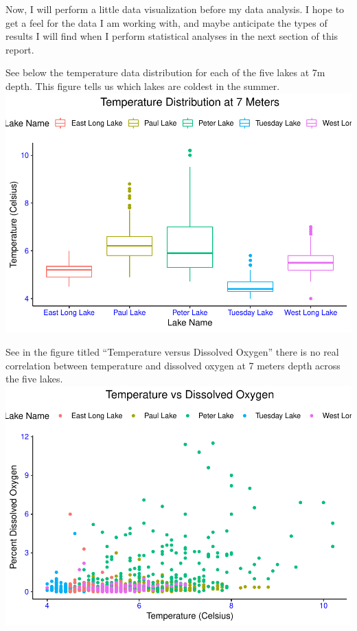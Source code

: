 \documentclass[12pt,]{article}
\begin{document}
Now, I will perform a little data visualization before my data analysis.
I hope to get a feel for the data I am working with, and maybe
anticipate the types of results I will find when I perform statistical
analyses in the next section of this report.

See below the temperature data distribution for each of the five lakes
at 7m depth. This figure tells us which lakes are coldest in the summer.
\includegraphics{KeithBollt_ENV872_FinalProject_files/figure-latex/visualization-1.pdf}

See in the figure titled ``Temperature versus Dissolved Oxygen'' there
is no real correlation between temperature and dissolved oxygen at 7
meters depth across the five lakes.
\includegraphics{KeithBollt_ENV872_FinalProject_files/figure-latex/visualization2-1.pdf}
\end{document}
